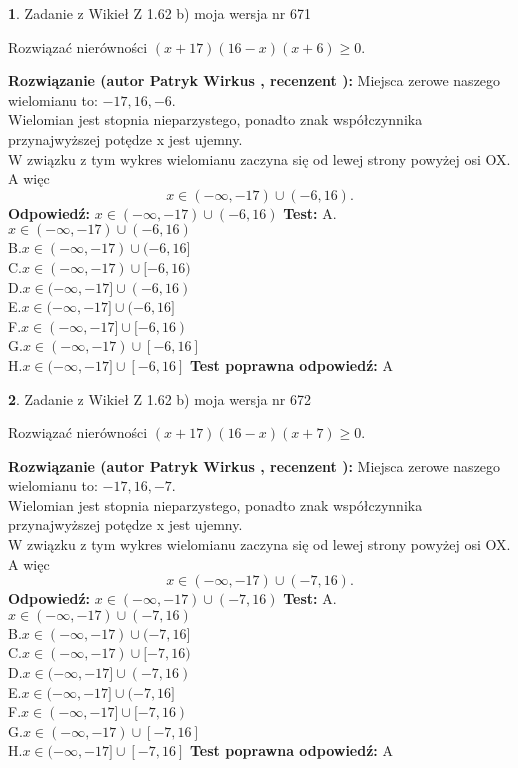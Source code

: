 \documentclass[12pt, a4paper]{article}
\theoremstyle{definition} %
\newtheorem{zad}{}
\newcommand{\zadStart}[1]{\begin{zad}#1\newline}
\newcommand{\zadStop}{\end{zad}}
\newcommand{\rozwStart}[2]{\noindent \textbf{Rozwiązanie (autor #1 , recenzent #2): }\newline}
\newcommand{\rozwStop}{\newline}
\newcommand{\odpStart}{\noindent \textbf{Odpowiedź:}\newline}
\newcommand{\odpStop}{\newline}
\newcommand{\testStart}{\noindent \textbf{Test:}\newline}
\newcommand{\testStop}{\newline}
\newcommand{\kluczStart}{\noindent \textbf{Test poprawna odpowiedź:}\newline}
\newcommand{\kluczStop}{\newline}
\begin{document}
\zadStart{Zadanie z Wikieł Z 1.62 b) moja wersja nr 671}

Rozwiązać nierówności $(x+17)(16-x)(x+6)\ge0$.
\zadStop
\rozwStart{Patryk Wirkus}{}
Miejsca zerowe naszego wielomianu to: $-17, 16, -6$.\\
Wielomian jest stopnia nieparzystego, ponadto znak współczynnika przy\linebreak najwyższej potędze x jest ujemny.\\ W związku z tym wykres wielomianu zaczyna się od lewej strony powyżej osi OX. A więc $$x \in (-\infty,-17) \cup (-6,16).$$
\rozwStop
\odpStart
$x \in (-\infty,-17) \cup (-6,16)$
\odpStop
\testStart
A.$x \in (-\infty,-17) \cup (-6,16)$\\
B.$x \in (-\infty,-17) \cup (-6,16]$\\
C.$x \in (-\infty,-17) \cup [-6,16)$\\
D.$x \in (-\infty,-17] \cup (-6,16)$\\
E.$x \in (-\infty,-17] \cup (-6,16]$\\
F.$x \in (-\infty,-17] \cup [-6,16)$\\
G.$x \in (-\infty,-17) \cup [-6,16]$\\
H.$x \in (-\infty,-17] \cup [-6,16]$
\testStop
\kluczStart
A
\kluczStop



\zadStart{Zadanie z Wikieł Z 1.62 b) moja wersja nr 672}

Rozwiązać nierówności $(x+17)(16-x)(x+7)\ge0$.
\zadStop
\rozwStart{Patryk Wirkus}{}
Miejsca zerowe naszego wielomianu to: $-17, 16, -7$.\\
Wielomian jest stopnia nieparzystego, ponadto znak współczynnika przy\linebreak najwyższej potędze x jest ujemny.\\ W związku z tym wykres wielomianu zaczyna się od lewej strony powyżej osi OX. A więc $$x \in (-\infty,-17) \cup (-7,16).$$
\rozwStop
\odpStart
$x \in (-\infty,-17) \cup (-7,16)$
\odpStop
\testStart
A.$x \in (-\infty,-17) \cup (-7,16)$\\
B.$x \in (-\infty,-17) \cup (-7,16]$\\
C.$x \in (-\infty,-17) \cup [-7,16)$\\
D.$x \in (-\infty,-17] \cup (-7,16)$\\
E.$x \in (-\infty,-17] \cup (-7,16]$\\
F.$x \in (-\infty,-17] \cup [-7,16)$\\
G.$x \in (-\infty,-17) \cup [-7,16]$\\
H.$x \in (-\infty,-17] \cup [-7,16]$
\testStop
\kluczStart
A
\kluczStop
\end{document}
